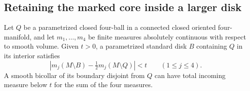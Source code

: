 \subsection{Retaining the marked core inside a larger disk}
\label{sec:balanced-exterior}

\begin{proposition}\label{prop:balanced-exterior}
Let \(Q\) be a parametrized closed four-ball in a connected closed
oriented four-manifold, and let \(m_1,\dots,m_4\) be finite measures
absolutely continuous with respect to smooth volume. Given \(t>0\),
a parametrized standard disk \(B\) containing \(Q\) in its interior
satisfies
\[
 \left|m_j(M\setminus B)-\tfrac12m_j(M\setminus Q)\right|<t
 \qquad (1\le j\le4).
\]
A smooth bicollar of its boundary disjoint from \(Q\) can have
total incoming measure below \(t\) for the sum of the four measures.
\end{proposition}

